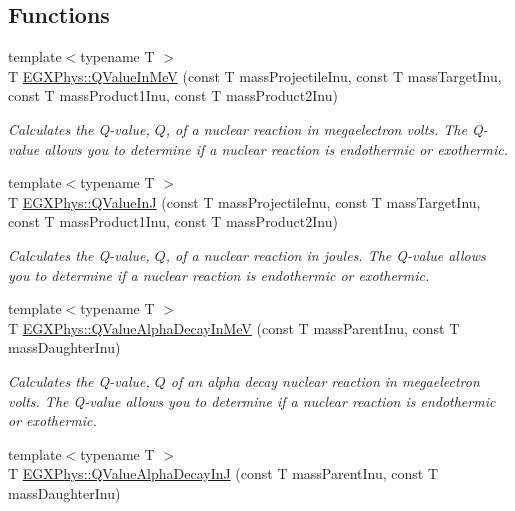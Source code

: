 \subsection*{Functions}
\begin{DoxyCompactItemize}
\item 
{\footnotesize template$<$typename T $>$ }\\T \mbox{\hyperlink{group___e_g_x_phys-_q_value_gab96ade2d74f5303e30a43ff97bd03841}{E\+G\+X\+Phys\+::\+Q\+Value\+In\+MeV}} (const T mass\+Projectile\+Inu, const T mass\+Target\+Inu, const T mass\+Product1\+Inu, const T mass\+Product2\+Inu)
\begin{DoxyCompactList}\small\item\em Calculates the Q-\/value, $Q$, of a nuclear reaction in megaelectron volts. The Q-\/value allows you to determine if a nuclear reaction is endothermic or exothermic. \end{DoxyCompactList}\item 
{\footnotesize template$<$typename T $>$ }\\T \mbox{\hyperlink{group___e_g_x_phys-_q_value_ga4b23be4fb0a3a9e7229c95377afc74b5}{E\+G\+X\+Phys\+::\+Q\+Value\+InJ}} (const T mass\+Projectile\+Inu, const T mass\+Target\+Inu, const T mass\+Product1\+Inu, const T mass\+Product2\+Inu)
\begin{DoxyCompactList}\small\item\em Calculates the Q-\/value, $Q$, of a nuclear reaction in joules. The Q-\/value allows you to determine if a nuclear reaction is endothermic or exothermic. \end{DoxyCompactList}\item 
{\footnotesize template$<$typename T $>$ }\\T \mbox{\hyperlink{group___e_g_x_phys-_q_value-_alpha_ga4f9a38d3ad4bf93471a0affb493b6e72}{E\+G\+X\+Phys\+::\+Q\+Value\+Alpha\+Decay\+In\+MeV}} (const T mass\+Parent\+Inu, const T mass\+Daughter\+Inu)
\begin{DoxyCompactList}\small\item\em Calculates the Q-\/value, $Q$ of an alpha decay nuclear reaction in megaelectron volts. The Q-\/value allows you to determine if a nuclear reaction is endothermic or exothermic. \end{DoxyCompactList}\item 
{\footnotesize template$<$typename T $>$ }\\T \mbox{\hyperlink{group___e_g_x_phys-_q_value-_alpha_gab8a50c18f6de3c1b6ed280c26c3ff3a5}{E\+G\+X\+Phys\+::\+Q\+Value\+Alpha\+Decay\+InJ}} (const T mass\+Parent\+Inu, const T mass\+Daughter\+Inu)

\end{DoxyCompactItemize}
